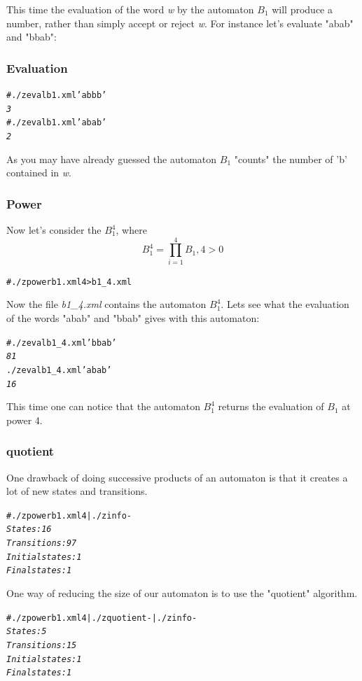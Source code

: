 This time the evaluation of the word \textit{w} by the automaton $B_1$
will produce a number, rather than simply accept or reject \textit{w}.
For instance let's evaluate "abab" and "bbab":

\subsubsection{Evaluation}

\begin{alltt}
# ./z eval b1.xml 'abbb'
\textit{3}
# ./z eval b1.xml 'abab'
\textit{2}
\end{alltt}

As you may have already guessed the automaton $B_1$ "counts" the
number of 'b' contained in \textit{w}.

\subsubsection{Power}

Now let's consider the $B_1^4$, where
$$B_1^4 = \prod_{i=1}^4 B_1, 4 > 0$$

\begin{alltt}
# ./z power b1.xml 4 > b1_4.xml
\end{alltt}

Now the file \textit{b1\_4.xml} contains the automaton $B_1^4$. Lets
see what the evaluation of the words "abab" and "bbab" gives with this
automaton:

\begin{alltt}
#./z eval b1_4.xml 'bbab'
\textit{81}
./z eval b1_4.xml 'abab'
\textit{16}
\end{alltt}

This time one can notice that the automaton $B_1^4$ returns the
evaluation of $B_1$ at power 4.

\subsubsection{quotient}

One drawback of doing successive products of an automaton is
that it creates a lot of new states and transitions.
\begin{alltt}
#./z power b1.xml 4 | ./z info -
\textit{States: 16}
\textit{Transitions: 97}
\textit{Initial states: 1}
\textit{Final states: 1}
\end{alltt}
One way of reducing the size of our automaton is to use the "quotient"
algorithm.
\begin{alltt}
#./z power b1.xml 4 | ./z quotient - | ./z info -
\textit{States: 5}
\textit{Transitions: 15}
\textit{Initial states: 1}
\textit{Final states: 1}
\end{alltt}

